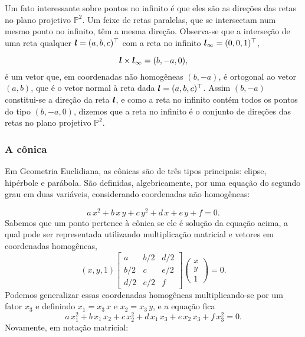 Um fato interessante sobre pontos no infinito é que eles são as direções das retas no plano projetivo $\mathbb{P}^2$. Um feixe de retas paralelas, que se intersectam num mesmo ponto no infinito, têm a mesma direção. Observa-se que a interseção de uma reta qualquer $\boldsymbol{l}=(a,b,c)^\top$ com a reta no infinito $\boldsymbol{l}_\infty=(0,0,1)^\top$,

\begin{equation*}
\boldsymbol{l}\times \boldsymbol{l}_\infty=(b,-a,0),
\end{equation*}
é um vetor que, em coordenadas não homogêneas $(b,-a)$, é ortogonal ao vetor $(a,b)$, que é o vetor normal à reta dada $\boldsymbol{l}=(a,b,c)^\top$. Assim $(b,-a)$ constitui-se a direção da reta $\boldsymbol{l}$, e como a reta no infinito contém todos os pontos do tipo $(b,-a,0)$, dizemos que a reta no infinito é o conjunto de direções das retas no plano projetivo $\mathbb{P}^2$.\\

\subsubsection{A cônica}\label{sec.definicao-conica}


Em Geometria Euclidiana, as cônicas são de três tipos principais: elipse, hipérbole e parábola. São definidas, algebricamente, por uma equação do segundo grau em duas variáveis, considerando coordenadas não homogêneas:

\begin{equation*}
a\,x^2+b\,x\,y+c\,y^2+d\,x+e\,y+f=0.
\end{equation*}
Sabemos que um ponto pertence à cônica se ele é solução da equação acima, a qual pode ser representada utilizando multiplicação matricial e vetores em coordenadas homogêneas,
\begin{equation*}
(x,y,1) 
 \begin{bmatrix}
a & b/2 & d/2\\
b/2 & c & e/2\\
d/2 & e/2 & f
\end{bmatrix}
 \begin{pmatrix}
x\\
y\\
1
\end{pmatrix}
 = 0.
\end{equation*}
Podemos generalizar essas coordenadas homogêneas multiplicando-se por um fator $x_3$ e definindo $x_1=x_3\,x$ e $x_2=x_3\,y$, e a equação fica
\begin{equation*}
a\,x_1^2+b\,x_1\,x_2+c\,x_2^2+d\,x_1\,x_3+e\,x_2\,x_3+f\,x_3^2=0.
\end{equation*}
Novamente, em notação matricial:

